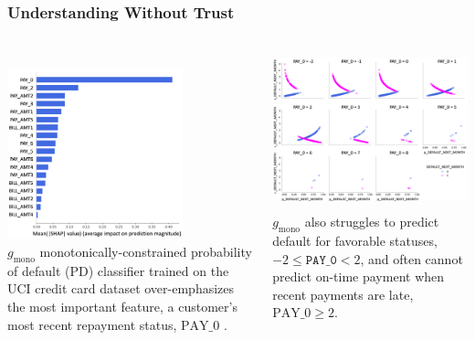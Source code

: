 \documentclass[11pt,
               aspectratio=169,
               hyperref={colorlinks}
               ]{beamer}
\begin{document}
	\begin{frame}[label={no_trust}]
	
		\frametitle{Understanding Without Trust}
		
					\begin{columns}
				
						\centering
						\vspace{7pt}\\
						\includegraphics[height=140pt]{img/global_shap.png}\\
						\vspace{5pt}
						\tiny{$g_{\text{mono}}$ monotonically-constrained probability of default (PD) classifier trained on the UCI credit card dataset over-emphasizes the most important feature, a customer's most recent repayment status, $\text{PAY\_0}$ \cite{uci}.}

						\vspace{10pt}
						\centering
						\includegraphics[height=130pt]{img/resid.png}\\
						\vspace{5pt}
						\tiny{$g_{\text{mono}}$ also struggles to predict default for favorable statuses, $-2  \leq \texttt{PAY\_0}  < 2$, and often cannot predict on-time payment when recent payments are late, $\text{PAY\_0} \geq 2$}.
				
					\end{columns}
					\normalsize				
		
	\end{frame}
	
\end{document}
